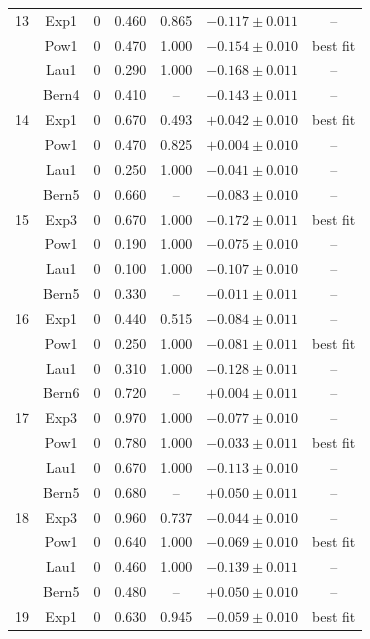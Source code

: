 \begin{table}[htbp]
\begin{center}
{\begin{tabular}{|c|c|c|c|c|c|c|}
      \hline
      13 & Exp1 & 0 & 0.460 & 0.865 & $-0.117 \pm 0.011$ & -- \\
       & Pow1 & 0 & 0.470 & 1.000 & $-0.154 \pm 0.010$ & best fit \\
       & Lau1 & 0 & 0.290 & 1.000 & $-0.168 \pm 0.011$ & -- \\
       & Bern4 & 0 & 0.410 & -- & $-0.143 \pm 0.011$ & -- \\
      \hline
      14 & Exp1 & 0 & 0.670 & 0.493 & $+0.042 \pm 0.010$ & best fit \\
       & Pow1 & 0 & 0.470 & 0.825 & $+0.004 \pm 0.010$ & -- \\
       & Lau1 & 0 & 0.250 & 1.000 & $-0.041 \pm 0.010$ & -- \\
       & Bern5 & 0 & 0.660 & -- & $-0.083 \pm 0.010$ & -- \\
      \hline
      15 & Exp3 & 0 & 0.670 & 1.000 & $-0.172 \pm 0.011$ & best fit \\
       & Pow1 & 0 & 0.190 & 1.000 & $-0.075 \pm 0.010$ & -- \\
       & Lau1 & 0 & 0.100 & 1.000 & $-0.107 \pm 0.010$ & -- \\
       & Bern5 & 0 & 0.330 & -- & $-0.011 \pm 0.011$ & -- \\
      \hline
      16 & Exp1 & 0 & 0.440 & 0.515 & $-0.084 \pm 0.011$ & -- \\
       & Pow1 & 0 & 0.250 & 1.000 & $-0.081 \pm 0.011$ & best fit \\
       & Lau1 & 0 & 0.310 & 1.000 & $-0.128 \pm 0.011$ & -- \\
       & Bern6 & 0 & 0.720 & -- & $+0.004 \pm 0.011$ & -- \\
      \hline
      17 & Exp3 & 0 & 0.970 & 1.000 & $-0.077 \pm 0.010$ & -- \\
       & Pow1 & 0 & 0.780 & 1.000 & $-0.033 \pm 0.011$ & best fit \\
       & Lau1 & 0 & 0.670 & 1.000 & $-0.113 \pm 0.010$ & -- \\
       & Bern5 & 0 & 0.680 & -- & $+0.050 \pm 0.011$ & -- \\
      \hline
      18 & Exp3 & 0 & 0.960 & 0.737 & $-0.044 \pm 0.010$ & -- \\
       & Pow1 & 0 & 0.640 & 1.000 & $-0.069 \pm 0.010$ & best fit \\
       & Lau1 & 0 & 0.460 & 1.000 & $-0.139 \pm 0.011$ & -- \\
       & Bern5 & 0 & 0.480 & -- & $+0.050 \pm 0.010$ & -- \\
      \hline
      19 & Exp1 & 0 & 0.630 & 0.945 & $-0.059 \pm 0.010$ & best fit \\

\end{tabular}}
\end{center}
\end{table}
